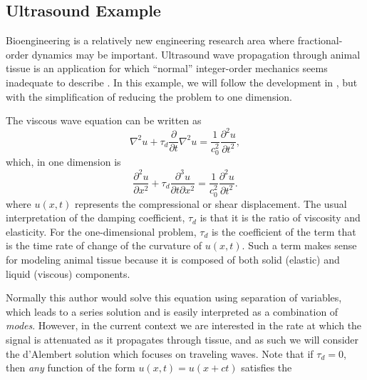 \subsection{Ultrasound Example}

Bioengineering is a relatively new engineering research area where fractional-order dynamics may be important. Ultrasound wave propagation through animal tissue is an application for which ``normal'' integer-order mechanics seems inadequate to describe \cite{holm}. In this example, we will follow the development in \cite{holm}, but with the simplification of reducing the problem to one dimension.

The viscous wave equation can be written as
\begin{equation}
  \nabla^2 u + \tau_d \frac{\partial}{\partial t} \nabla^2 u = \frac{1}{c_0^2} \frac{\partial^2 u}{\partial t^2},
\end{equation}
which, in one dimension is
\begin{equation}
  \frac{\partial^2 u}{\partial x^2} + \tau_d \frac{\partial^3 u}{\partial t \partial x^2} =  \frac{1}{c_0^2} \frac{\partial^2 u}{\partial t^2}.
  \label{eq:1dultra}
\end{equation}
where $u(x,t)$ represents the compressional or shear displacement. The usual interpretation of the damping coefficient, $\tau_d$ is that it is the ratio of viscosity and elasticity. For the one-dimensional problem, $\tau_d$ is the coefficient of the term that is the time rate of change of the curvature of $u(x,t)$. Such a term makes sense for modeling animal tissue because it is composed of both solid (elastic) and liquid (viscous) components.

Normally this author would solve this equation using separation of variables, which leads to a series solution and is easily interpreted as a combination of \emph{modes}. However, in the current context we are interested in the rate at which the signal is attenuated as it propagates through tissue, and as such we will consider the d'Alembert solution which focuses on traveling waves. Note that if $\tau_d=0$, then \emph{any} function of the form $u(x,t) = u(x + c t)$ satisfies the

